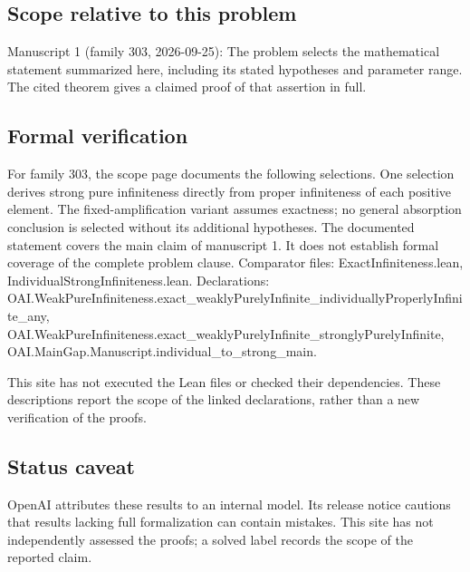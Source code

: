 \documentclass[11pt]{article}
\begin{document}
\subsection{Scope relative to this problem}
Manuscript 1 (family 303, 2026-09-25): The problem selects the mathematical statement summarized here, including its stated hypotheses and parameter range. The cited theorem gives a claimed proof of that assertion in full.

\subsection{Formal verification}
For family 303, the scope page documents the following selections. One selection derives strong pure infiniteness directly from proper infiniteness of each positive element. The fixed-amplification variant assumes exactness; no general absorption conclusion is selected without its additional hypotheses. The documented statement covers the main claim of manuscript 1. It does not establish formal coverage of the complete problem clause. Comparator files: ExactInfiniteness.lean, IndividualStrongInfiniteness.lean. Declarations: OAI.WeakPureInfiniteness.exact\_weaklyPurelyInfinite\_individuallyProperlyInfinite\_any, OAI.WeakPureInfiniteness.exact\_weaklyPurelyInfinite\_stronglyPurelyInfinite, OAI.MainGap.Manuscript.individual\_to\_strong\_main.

This site has not executed the Lean files or checked their dependencies. These descriptions report the scope of the linked declarations, rather than a new verification of the proofs.

\subsection{Status caveat}
OpenAI attributes these results to an internal model. Its release notice cautions that results lacking full formalization can contain mistakes. This site has not independently assessed the proofs; a solved label records the scope of the reported claim.
\end{document}
